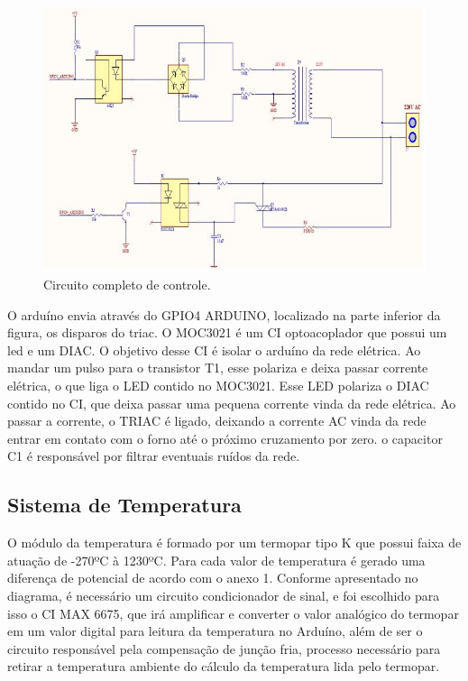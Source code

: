 \begin{figure}[H]
	\centering
	\label{circuitocontrole}
	\includegraphics[keepaspectratio=true,scale=1.0]{figuras/circuitocontrole.JPG}
	\caption{Circuito completo de controle.}
\end{figure}

O arduíno envia através do GPIO4 ARDUINO, localizado na parte inferior da figura, os disparos do triac. O MOC3021 é um CI optoacoplador que possui um led e um DIAC. O objetivo desse CI é isolar o arduíno da rede elétrica. Ao mandar um pulso para o transistor T1, esse polariza e deixa passar corrente elétrica, o que liga o LED contido no MOC3021. Esse LED polariza o DIAC contido no CI, que deixa passar uma pequena corrente vinda da rede elétrica. Ao passar a corrente, o TRIAC é ligado, deixando a corrente AC vinda da rede entrar em contato com o forno até o próximo cruzamento por zero. o capacitor C1 é responsável por filtrar eventuais ruídos da rede.

\subsection{Sistema de Temperatura}
O módulo da temperatura é formado por um termopar tipo K que possui faixa de atuação de -270ºC à 1230ºC. Para cada valor de temperatura é gerado uma diferença de potencial de acordo com o anexo 1. Conforme apresentado no diagrama, é necessário um circuito condicionador de sinal, e foi escolhido para isso o CI MAX 6675, que irá amplificar e converter o valor analógico do termopar em um valor digital para leitura da temperatura no Arduíno, além de ser o circuito responsável pela compensação de junção fria, processo necessário para retirar a temperatura ambiente do cálculo da temperatura lida pelo termopar. 

